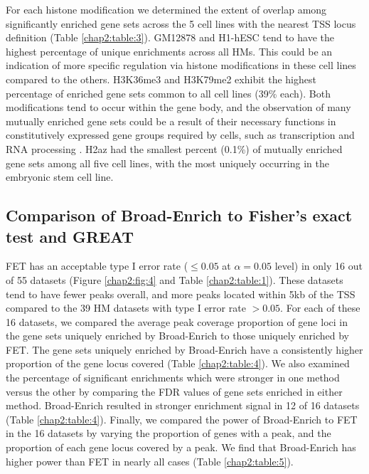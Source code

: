 For each histone modification we determined the extent of overlap among significantly enriched gene sets across the 5 cell lines with the nearest TSS locus definition (Table \ref{chap2:table:3}). GM12878 and H1-hESC tend to have the highest percentage of unique enrichments across all HMs. This could be an indication of more specific regulation via histone modifications in these cell lines compared to the others. H3K36me3 and H3K79me2 exhibit the highest percentage of enriched gene sets common to all cell lines (39\% each). Both modifications tend to occur within the gene body, and the observation of many mutually enriched gene sets could be a result of their necessary functions in constitutively expressed gene groups required by cells, such as transcription and RNA processing \cite{ENCODEProjectConsortium:2012gc}. H2az had the smallest percent (0.1\%) of mutually enriched gene sets among all five cell lines, with the most uniquely occurring in the embryonic stem cell line.

\subsection{Comparison of Broad-Enrich to Fisher’s exact test and GREAT}
\label{broad_results_great}

FET has an acceptable type I error rate ($\leq 0.05$ at $\alpha = 0.05$ level) in only 16 out of 55 datasets (Figure \ref{chap2:fig:4} and Table \ref{chap2:table:1}). These datasets tend to have fewer peaks overall, and more peaks located within 5kb of the TSS compared to the 39 HM datasets with type I error rate $> 0.05$. For each of these 16 datasets, we compared the average peak coverage proportion of gene loci in the gene sets uniquely enriched by Broad-Enrich to those uniquely enriched by FET. The gene sets uniquely enriched by Broad-Enrich have a consistently higher proportion of the gene locus covered (Table \ref{chap2:table:4}). We also examined the percentage of significant enrichments which were stronger in one method versus the other by comparing the FDR values of gene sets enriched in either method. Broad-Enrich resulted in stronger enrichment signal in 12 of 16 datasets (Table \ref{chap2:table:4}). Finally, we compared the power of Broad-Enrich to FET in the 16 datasets by varying the proportion of genes with a peak, and the proportion of each gene locus covered by a peak. We find that Broad-Enrich has higher power than FET in nearly all cases (Table \ref{chap2:table:5}).

